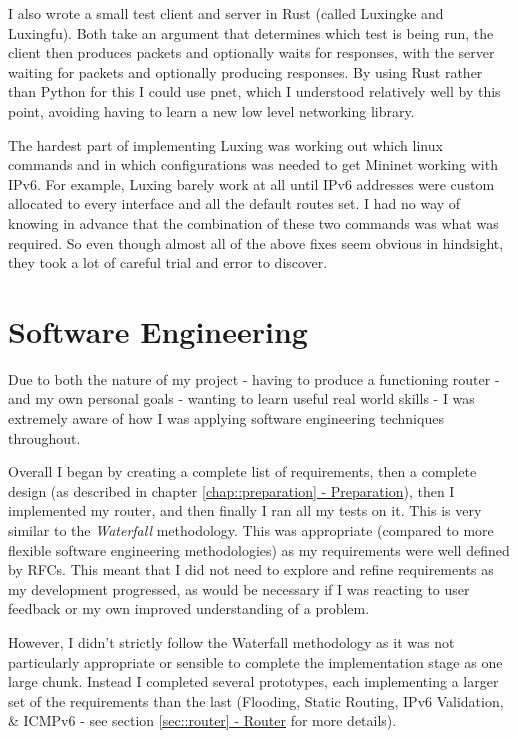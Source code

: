 \documentclass[12pt,a4paper,twoside,openany]{report}
\begin{document}
\bigskip

I also wrote a small test client and server in Rust (called Luxingke and Luxingfu).  Both take an argument that determines which test is being run, the client then produces packets and optionally waits for responses, with the server waiting for packets and optionally producing responses.  By using Rust rather than Python for this I could use pnet, which I understood relatively well by this point, avoiding having to learn a new low level networking library.

\bigskip

The hardest part of implementing Luxing was working out which linux commands and in which configurations was needed to get Mininet working with IPv6.  For example, Luxing barely work at all until IPv6 addresses were custom allocated to every interface and all the default routes set.  I had no way of knowing in advance that the combination of these two commands was what was required.  So even though almost all of the above fixes seem obvious in hindsight, they took a lot of careful trial and error to discover.

\section{Software Engineering}
\label{sec::soft_eng}

Due to both the nature of my project - having to produce a functioning router - and my own personal goals - wanting to learn useful real world skills - I was extremely aware of how I was applying software engineering techniques throughout.

\bigskip

Overall I began by creating a complete list of requirements, then a complete design (as described in chapter \ref{chap::preparation}\hyperref[chap::preparation]{ - Preparation}), then I implemented my router, and then finally I ran all my tests on it.  This is very similar to the \textit{Waterfall} methodology.  This was appropriate (compared to more flexible software engineering methodologies) as my requirements were well defined by RFCs. This meant that I did not need to explore and refine requirements as my development progressed, as would be necessary if I was reacting to user feedback or my own improved understanding of a problem.

\bigskip

However, I didn't strictly follow the Waterfall methodology as it was not particularly appropriate or sensible to complete the implementation stage as one large chunk.  Instead I completed several prototypes, each implementing a larger set of the requirements than the last (Flooding, Static Routing, IPv6 Validation, \& ICMPv6 - see section \ref{sec::router}\hyperref[sec::router]{ - Router} for more details). 
\end{document}
